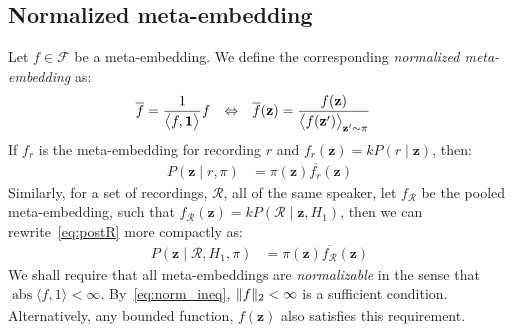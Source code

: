 \documentclass[a4paper,oneside,12pt,english]{report}
\def\zvec{\mathbf{z}}
\DeclareMathOperator{\abs}{abs}
\def\expv#1#2{\bigl\langle#1\bigr\rangle_{#2}}
\def\Rset{\mathcal{R}}
\def\Fset{\mathcal{F}}
\def\dot#1#2{\expv{#1,#2}{}}
\def\normal#1{\overline{#1}}
\begin{document}
\subsection{Normalized meta-embedding}
\label{sec:normalization}
Let $f\in\Fset$ be a meta-embedding. We define the corresponding \emph{normalized meta-embedding} as:
\begin{align}
\label{eq:normalize}
\normal{f} &= \frac{1}{\dot{f}{\onevec}} f & \Leftrightarrow && 
\normal{f}(\zvec) &= \frac{f(\zvec)}{\expv{f(\zvec')}{\zvec'\sim\pi}}
\end{align}
If $f_r$ is the meta-embedding for recording $r$ and $f_r(\zvec)=kP(r\mid\zvec)$, then:
\begin{align}
P(\zvec\mid r,\pi) &= \pi(\zvec)\normal{f_r}(\zvec)
\end{align}
Similarly, for a set of recordings, $\Rset$, all of the same speaker, let $f_\Rset$ be the pooled meta-embedding, such that $f_\Rset(\zvec)=kP(\Rset\mid\zvec,H_1)$, then we can rewrite~\eqref{eq:postR} more compactly as:
\begin{align}
P(\zvec\mid\Rset,H_1,\pi) &= \pi(\zvec)\normal{f_\Rset}(\zvec)
\end{align}
We shall require that all meta-embeddings are \emph{normalizable} in the sense that $\abs{\dot{f}{1}}<\infty$. By~\eqref{eq:norm_ineq}, $\lVert f\rVert_2<\infty$ is a sufficient condition. Alternatively, any bounded function, $f(\zvec)$ also satisfies this requirement. 
\end{document}
